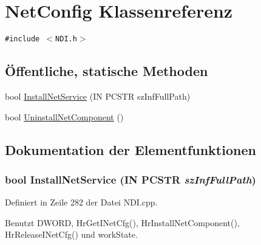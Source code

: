 \hypertarget{classQbeNDI_1_1NetConfig}{
\section{Net\-Config Klassenreferenz}
\label{classQbeNDI_1_1NetConfig}
}
{\tt \#include $<$NDI.h$>$}

\subsection*{\"{O}ffentliche, statische Methoden}
\begin{CompactItemize}
\item 
bool \hyperlink{classQbeNDI_1_1NetConfig_QbeNDI_1_1NetConfige0}{Install\-Net\-Service} (IN PCSTR sz\-Inf\-Full\-Path)
\item 
bool \hyperlink{classQbeNDI_1_1NetConfig_QbeNDI_1_1NetConfige1}{Uninstall\-Net\-Component} ()
\end{CompactItemize}


\subsection{Dokumentation der Elementfunktionen}
\hypertarget{classQbeNDI_1_1NetConfig_QbeNDI_1_1NetConfige0}{
\subsubsection[InstallNetService]{\setlength{\rightskip}{0pt plus 5cm}bool Install\-Net\-Service (IN PCSTR {\em sz\-Inf\-Full\-Path})}}
\label{classQbeNDI_1_1NetConfig_QbeNDI_1_1NetConfige0}




Definiert in Zeile 282 der Datei NDI.cpp.

Benutzt DWORD, Hr\-Get\-INet\-Cfg(), Hr\-Install\-Net\-Component(), Hr\-Release\-INet\-Cfg() und work\-State.



